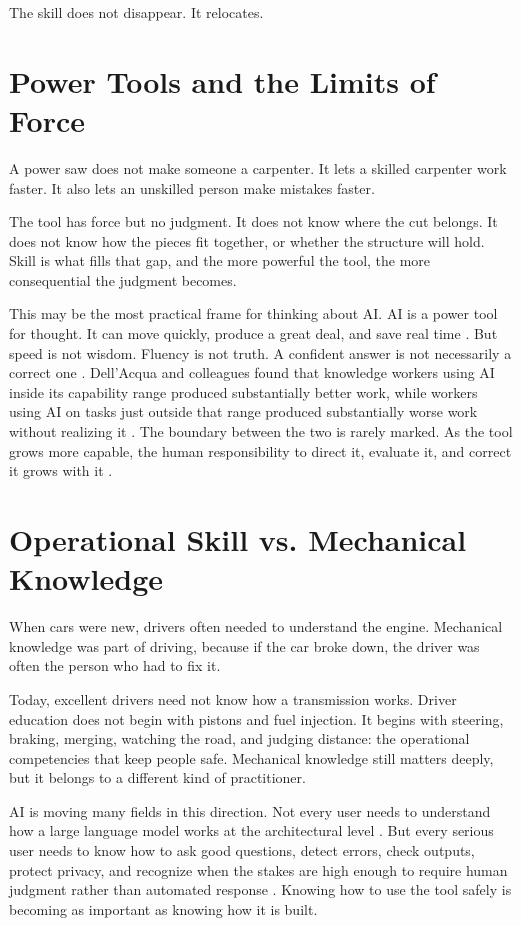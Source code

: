 \documentclass[12pt]{article}
\begin{document}
The skill does not disappear. It relocates.

\section{Power Tools and the Limits of Force}

A power saw does not make someone a carpenter. It lets a skilled carpenter work faster. It also lets an unskilled person make mistakes faster.

The tool has force but no judgment. It does not know where the cut belongs. It does not know how the pieces fit together, or whether the structure will hold. Skill is what fills that gap, and the more powerful the tool, the more consequential the judgment becomes.

This may be the most practical frame for thinking about AI. AI is a power tool for thought. It can move quickly, produce a great deal, and save real time \citep{noy2023experimental}. But speed is not wisdom. Fluency is not truth. A confident answer is not necessarily a correct one \citep{bender2021dangers}. Dell'Acqua and colleagues found that knowledge workers using AI inside its capability range produced substantially better work, while workers using AI on tasks just outside that range produced substantially worse work without realizing it \citep{dellacqua2023navigating}. The boundary between the two is rarely marked. As the tool grows more capable, the human responsibility to direct it, evaluate it, and correct it grows with it \citep{russell2019human}.

\section{Operational Skill vs. Mechanical Knowledge}

When cars were new, drivers often needed to understand the engine. Mechanical knowledge was part of driving, because if the car broke down, the driver was often the person who had to fix it.

Today, excellent drivers need not know how a transmission works. Driver education does not begin with pistons and fuel injection. It begins with steering, braking, merging, watching the road, and judging distance: the operational competencies that keep people safe. Mechanical knowledge still matters deeply, but it belongs to a different kind of practitioner.

AI is moving many fields in this direction. Not every user needs to understand how a large language model works at the architectural level \citep{bommasani2021opportunities}. But every serious user needs to know how to ask good questions, detect errors, check outputs, protect privacy, and recognize when the stakes are high enough to require human judgment rather than automated response \citep{weidinger2021ethical}. Knowing how to use the tool safely is becoming as important as knowing how it is built.
\end{document}
